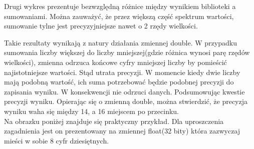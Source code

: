 \documentclass[10pt]{article}
\begin{document}
Drugi wykres prezentuje bezwzględną różnice między wynikiem biblioteki a sumowaniami. Można zauważyć, że przez większą część spektrum wartości, sumowanie tylne jest precyzyjniejsze nawet o 2 rzędy wielkości.


\begin{center}
\end{center}

Takie rezultaty wynikają z natury działania zmiennej double. W przypadku sumowania liczby większej do liczby mniejszej(gdzie różnica wynosi parę rzędów wielkości), zmienna odrzuca końcowe cyfry mniejszej liczby by pomieścić najistotniejsze wartości. Stąd utrata precyzji. W momencie kiedy dwie liczby mają podobną wartość, ich suma potrzebować będzie podobnej precyzji do zapisania wyniku. W konsekwencji nie odrzuci danych. Podsumowując kwestie precyzji wyniku. Opierając się o zmienną double, można stwierdzić, że precyzja wyniku waha się między 14, a 16 miejscem po przecinku.\\
Na obrazku poniżej znajduje się praktyczny przykład. Dla uproszczenia zagadnienia jest on prezentowany na zmiennej float(32 bity) która zazwyczaj mieści w sobie 8 cyfr dziesiętnych.\\

\begin{center}
\end{center}
\end{document}
